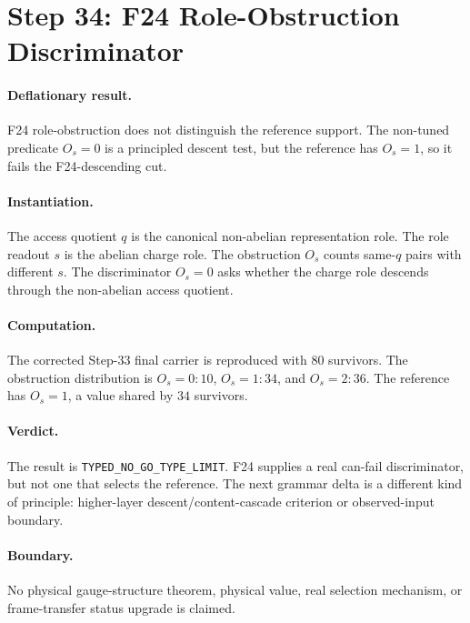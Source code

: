 \section{Step 34: F24 Role-Obstruction Discriminator}

\paragraph{Deflationary result.}
F24 role-obstruction does not distinguish the reference support.  The non-tuned predicate \(O_s=0\) is a principled descent test, but the reference has \(O_s=1\), so it fails the F24-descending cut.

\paragraph{Instantiation.}
The access quotient \(q\) is the canonical non-abelian representation role.  The role readout \(s\) is the abelian charge role.  The obstruction \(O_s\) counts same-\(q\) pairs with different \(s\).  The discriminator \(O_s=0\) asks whether the charge role descends through the non-abelian access quotient.

\paragraph{Computation.}
The corrected Step-33 final carrier is reproduced with \(80\) survivors.  The obstruction distribution is \(O_s=0:10\), \(O_s=1:34\), and \(O_s=2:36\).  The reference has \(O_s=1\), a value shared by \(34\) survivors.

\paragraph{Verdict.}
The result is \texttt{TYPED\_NO\_GO\_TYPE\_LIMIT}.  F24 supplies a real can-fail discriminator, but not one that selects the reference.  The next grammar delta is a different kind of principle: higher-layer descent/content-cascade criterion or observed-input boundary.

\paragraph{Boundary.}
No physical gauge-structure theorem, physical value, real selection mechanism, or frame-transfer status upgrade is claimed.
